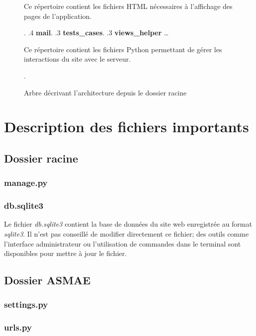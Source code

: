 \begin{figure}[!ht]
\begin{framed}
{\begin{minipage}[t]{10cm}
									Ce répertoire contient les fichiers
									HTML nécessaires à l'affichage des pages
									de l'application{.}
									\end{minipage}.
			.4 \textbf{mail}.
			.3 \textbf{tests\_cases}.
			.3 \textbf{views\_helper} \ldots{} \begin{minipage}[t]{10cm}
									Ce répertoire contient les fichiers
									Python permettant de gérer les interactions
									du site avec le serveur{.}
									\end{minipage}.
		}
	\end{framed}
	\caption{Arbre décrivant l'architecture depuis le dossier racine}
	\label{fig:Architecture des dossiers}
\end{figure}
\FloatBarrier

\section{Description des fichiers importants}

\subsection{Dossier racine}

\subsubsection{manage.py}

\subsubsection{db.sqlite3}

Le fichier \textit{db.sqlite3} contient la base de données du site web enregistrée au format \textit{sqlite3}. Il n'est pas conseillé de modifier directement ce fichier; des outils comme l'interface administrateur ou l'utilisation de commandes dans le terminal sont disponibles pour mettre à jour le fichier.

\subsection{Dossier ASMAE}

\subsubsection{settings.py}

\subsubsection{urls.py}

